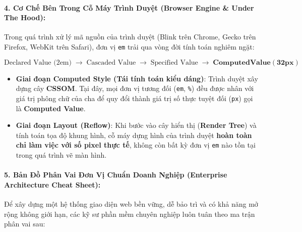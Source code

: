 \documentclass[11pt,oneside]{book}
\newcommand{\codeinline}[1]{\textcolor{accentOrange}{\texttt{#1}}}
\newcommand{\term}[1]{\textbf{\textcolor{primaryBlue}{#1}}}
\begin{document}
\paragraph{4. Cơ Chế Bên Trong Cỗ Máy Trình Duyệt (Browser Engine \& Under The Hood):}
Trong quá trình xử lý mã nguồn của trình duyệt (Blink trên Chrome, Gecko trên Firefox, WebKit trên Safari), đơn vị \codeinline{em} trải qua vòng đời tính toán nghiêm ngặt:

\begin{conceptBox}
\[
\text{Declared Value (2em)} \;\longrightarrow\; \text{Cascaded Value} \;\longrightarrow\; \text{Specified Value} \;\longrightarrow\; \mathbf{Computed Value (32px)}
\]
\vspace{-4pt}
\begin{itemize}[leftmargin=1.5em, itemsep=2pt, parsep=0pt]
    \item \textbf{Giai đoạn Computed Style (Tái tính toán kiểu dáng)}: Trình duyệt xây dựng cây \term{CSSOM}. Tại đây, mọi đơn vị tương đối (\codeinline{em}, \codeinline{\%}) đều được nhân với giá trị phông chữ của cha để quy đổi thành giá trị số thực tuyệt đối (\codeinline{px}) gọi là \textbf{Computed Value}.
    \item \textbf{Giai đoạn Layout (Reflow)}: Khi bước vào cây hiển thị (\term{Render Tree}) và tính toán tọa độ khung hình, cỗ máy dựng hình của trình duyệt \textbf{hoàn toàn chỉ làm việc với số pixel thực tế}, không còn bất kỳ đơn vị \codeinline{em} nào tồn tại trong quá trình vẽ màn hình.
\end{itemize}
\end{conceptBox}

\paragraph{5. Bản Đồ Phân Vai Đơn Vị Chuẩn Doanh Nghiệp (Enterprise Architecture Cheat Sheet):}
Để xây dựng một hệ thống giao diện web bền vững, dễ bảo trì và có khả năng mở rộng không giới hạn, các kỹ sư phần mềm chuyên nghiệp luôn tuân theo ma trận phân vai sau:
\end{document}
